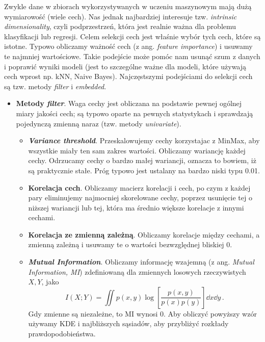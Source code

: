 \documentclass{myclass}
\numberwithin{equation}{section}
\begin{document}
Zwykle dane w zbiorach wykorzystywanych w uczeniu maszynowym mają dużą wymiarowość (wiele cech). Nas
jednak najbardziej interesuje tzw. \textit{intrinsic dimensionality}, czyli podprzestrzeń, która
jest realnie ważna dla problemu klasyfikacji lub regresji. Celem selekcji cech jest właśnie wybór
tych cech, które są istotne. Typowo obliczamy ważność cech (z ang. \textit{feature importance}) i
usuwamy te najmniej wartościowe. Takie podejście może pomóc nam usunąć szum z danych i poprawić
wyniki modeli (jest to szczególne ważne dla modeli, które używają cech wprost np. kNN, Naive Bayes).
Najczęstszymi podejściami do selekcji cech są tzw. metody \textit{filter} i \textit{embedded}.
\begin{itemize}
    
    \item \textbf{Metody \textit{filter}}. Waga cechy jest obliczana na podstawie pewnej ogólnej
    miary jakości cech; są typowo oparte na pewnych statystykach i sprawdzają pojedynczą zmienną
    naraz (tzw. metody \textit{univariate}).
    
    \begin{itemize}

        \item \textbf{\textit{Variance threshold}}. Przeskalowujemy cechy korzystajac z MinMax, aby
        wszystkie miały ten sam zakres wartości. Obliczamy wariancję każdej cechy. Odrzucamy cechy o
        bardzo małej wariancji, oznacza to bowiem, iż są praktycznie stałe. Próg typowo jest
        ustalany na bardzo niski typu 0.01.

        \item \textbf{Korelacja cech}. Obliczamy macierz korelacji i cech, po czym z każdej pary
        eliminujemy najmocniej skorelowane cechy, poprzez usunięcie tej o niższej wariancji lub tej,
        która ma średnio większe korelacje z innymi cechami.

        \item \textbf{Korelacja ze zmienną zależną}. Obliczamy korelacje między cechami, a zmienną
        zależną i usuwamy te o wartości bezwzględnej bliskiej 0. 

        \item \textbf{\textit{Mutual Information}}. Obliczamy informację wzajemną (z ang.
        \textit{Mutual Information, MI}) zdefiniowaną dla zmiennych losowych rzeczywistych \(X, Y\),
        jako
        \begin{equation}
            I(X; Y) = \iint p(x, y) \log\left[\frac{p(x,y)}{p(x)p(y)}\right] \dd{x}\dd{y}\,.
        \end{equation}
        Gdy zmienne są niezależne, to MI wynosi 0. Aby obliczyć powyższy wzór używamy KDE i
        najbliższych sąsiadów, aby przybliżyć rozkłady prawdopodobieństwa.


\end{itemize}
\end{itemize}
\end{document}
